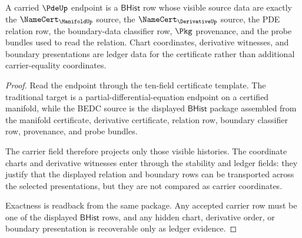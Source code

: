 \begin{theorem}
\label{thm:pde-carrier-obligation}
A carried $\PdeUp$ endpoint is a $\mathsf{BHist}$ row whose visible source
data are exactly the $\NameCert_{\ManifoldUp}$ source, the
$\NameCert_{\DerivativeUp}$ source, the PDE relation row, the boundary-data
classifier row, $\Pkg$ provenance, and the probe bundles used to read the
relation. Chart coordinates, derivative witnesses, and boundary presentations
are ledger data for the certificate rather than additional carrier-equality
coordinates.
\end{theorem}
\begin{proof}
Read the endpoint through the ten-field certificate template. The
traditional target is a partial-differential-equation endpoint on a certified
manifold, while the BEDC source is the displayed $\mathsf{BHist}$ package
assembled from the manifold certificate, derivative certificate, relation
row, boundary classifier row, provenance, and probe bundles.

The carrier field therefore projects only those visible histories. The
coordinate charts and derivative witnesses enter through the stability and
ledger fields: they justify that the displayed relation and boundary rows can
be transported across the selected presentations, but they are not compared
as carrier coordinates.

Exactness is readback from the same package. Any accepted carrier row must be
one of the displayed $\mathsf{BHist}$ rows, and any hidden chart, derivative
order, or boundary presentation is recoverable only as ledger evidence.
\end{proof}

